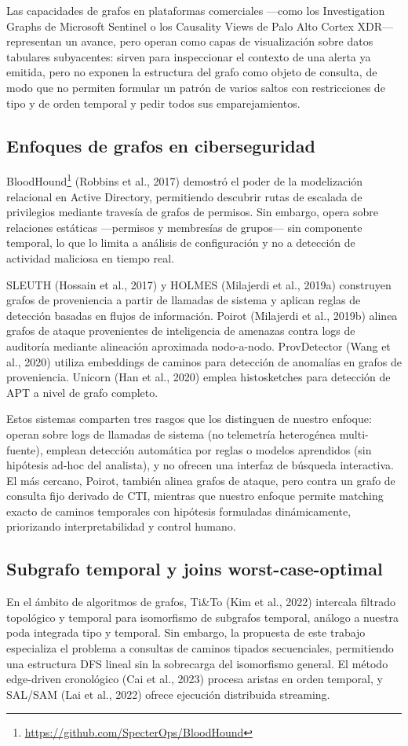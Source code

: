 \documentclass[11pt,a4paper]{article}
\begin{document}
Las capacidades de grafos en plataformas comerciales ---como los Investigation
Graphs de Microsoft Sentinel o los Causality Views de Palo Alto Cortex XDR---
representan un avance, pero operan como capas de visualización sobre datos
tabulares subyacentes: sirven para inspeccionar el contexto de una alerta ya
emitida, pero no exponen la estructura del grafo como objeto de consulta, de
modo que no permiten formular un patrón de varios saltos con restricciones de
tipo y de orden temporal y pedir todos sus emparejamientos.

\subsection{Enfoques de grafos en ciberseguridad}
BloodHound\footnote{\url{https://github.com/SpecterOps/BloodHound}} (Robbins et
al., 2017) demostró el poder de la modelización relacional en Active Directory,
permitiendo descubrir rutas de escalada de privilegios mediante travesía de
grafos de permisos. Sin embargo, opera sobre relaciones estáticas ---permisos y
membresías de grupos--- sin componente temporal, lo que lo limita a análisis de
configuración y no a detección de actividad maliciosa en tiempo real.

SLEUTH (Hossain et al., 2017) y HOLMES (Milajerdi et al., 2019a) construyen
grafos de proveniencia a partir de llamadas de sistema y aplican reglas de
detección basadas en flujos de información. Poirot (Milajerdi et al., 2019b)
alinea grafos de ataque provenientes de inteligencia de amenazas contra logs de
auditoría mediante alineación aproximada nodo-a-nodo. ProvDetector (Wang et
al., 2020) utiliza embeddings de caminos para detección de anomalías en grafos
de proveniencia. Unicorn (Han et al., 2020) emplea histosketches para detección
de APT a nivel de grafo completo.

Estos sistemas comparten tres rasgos que los distinguen de nuestro enfoque:
operan sobre logs de llamadas de sistema (no telemetría heterogénea
multi-fuente), emplean detección automática por reglas o modelos aprendidos
(sin hipótesis ad-hoc del analista), y no ofrecen una interfaz de búsqueda
interactiva. El más cercano, Poirot, también alinea grafos de ataque, pero
contra un grafo de consulta fijo derivado de CTI, mientras que nuestro enfoque
permite matching exacto de caminos temporales con hipótesis formuladas
dinámicamente, priorizando interpretabilidad y control humano.

\subsection{Subgrafo temporal y joins worst-case-optimal}
En el ámbito de algoritmos de grafos, Ti\&To (Kim et al., 2022) intercala
filtrado topológico y temporal para isomorfismo de subgrafos temporal, análogo
a nuestra poda integrada tipo y temporal. Sin embargo, la propuesta de este
trabajo especializa el problema a consultas de caminos tipados secuenciales,
permitiendo una estructura DFS lineal sin la sobrecarga del isomorfismo
general. El método edge-driven cronológico (Cai et al., 2023) procesa aristas
en orden temporal, y SAL/SAM (Lai et al., 2022) ofrece ejecución distribuida
streaming.
\end{document}
